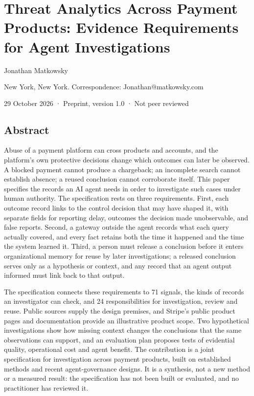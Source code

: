 \documentclass[
  11pt,
]{article}
\author{}
\date{}
\begin{document}
\FloatBarrier

\begingroup\raggedright{}

\hypertarget{threat-analytics-across-payment-products-evidence-requirements-for-agent-investigations}{%
\section{Threat Analytics Across Payment Products: Evidence Requirements
for Agent
Investigations}\label{threat-analytics-across-payment-products-evidence-requirements-for-agent-investigations}}

\endgroup

\suppressfloats[t]

Jonathan Matkowsky

New York, New York. Correspondence: Jonathan@matkowsky.com

29 October 2026 · Preprint, version 1.0 · Not peer reviewed

\FloatBarrier

\hypertarget{abstract}{%
\subsection{Abstract}\label{abstract}}

\suppressfloats[t]

Abuse of a payment platform can cross products and accounts, and the
platform's own protective decisions change which outcomes can later be
observed. A blocked payment cannot produce a chargeback; an incomplete
search cannot establish absence; a reused conclusion cannot corroborate
itself. This paper specifies the records an AI agent needs in order to
investigate such cases under human authority. The specification rests on
three requirements. First, each outcome record links to the control
decision that may have shaped it, with separate fields for reporting
delay, outcomes the decision made unobservable, and false reports.
Second, a gateway outside the agent records what each query actually
covered, and every fact retains both the time it happened and the time
the system learned it. Third, a person must release a conclusion before
it enters organizational memory for reuse by later investigations; a
released conclusion serves only as a hypothesis or context, and any
record that an agent output informed must link back to that output.

The specification connects these requirements to 71 signals, the kinds
of records an investigator can check, and 24 responsibilities for
investigation, review and reuse. Public sources supply the design
premises, and Stripe's public product pages and documentation provide an
illustrative product scope. Two hypothetical investigations show how
missing context changes the conclusions that the same observations can
support, and an evaluation plan proposes tests of evidential quality,
operational cost and agent benefit. The contribution is a joint
specification for investigation across payment products, built on
established methods and recent agent-governance designs. It is a
synthesis, not a new method or a measured result: the specification has
not been built or evaluated, and no practitioner has reviewed it.
\end{document}
